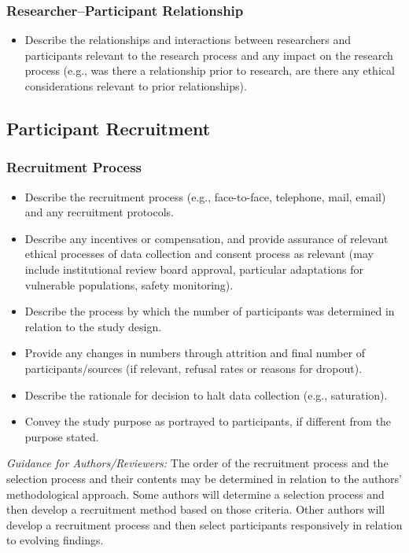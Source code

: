 \documentclass[acmsmall]{acmart}
\begin{document}
\subsubsection{Researcher–Participant Relationship}
\begin{itemize}
    \item Describe the relationships and interactions between researchers and participants
relevant to the research process and any impact on the research process (e.g., was
there a relationship prior to research, are there any ethical considerations relevant
to prior relationships).

\end{itemize}

\subsection{Participant Recruitment}
\subsubsection{Recruitment Process}

\begin{itemize}
    \item Describe the recruitment process (e.g., face-to-face, telephone, mail, email) and any
recruitment protocols.
\item  Describe any incentives or compensation, and provide assurance of relevant ethical
processes of data collection and consent process as relevant (may include institutional
review board approval, particular adaptations for vulnerable populations, safety monitoring).
\item  Describe the process by which the number of participants was determined in relation to the
study design.
\item  Provide any changes in numbers through attrition and final number of participants/sources
(if relevant, refusal rates or reasons for dropout).
\item  Describe the rationale for decision to halt data collection (e.g., saturation).
\item  Convey the study purpose as portrayed to participants, if different from the purpose stated.
\end{itemize}


\textit{Guidance for Authors/Reviewers:} The order of the recruitment process and the selection process and their contents may be determined in relation to the authors’ methodological approach. Some authors will determine a selection process and then develop a recruitment method based on those criteria. Other authors will develop a recruitment process and then select participants responsively in relation to evolving findings.
\vspace{3mm}
\end{document}
